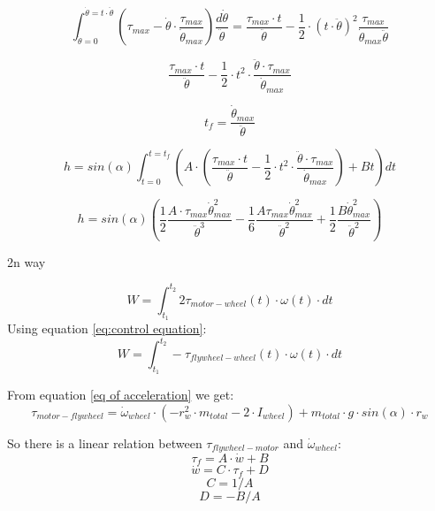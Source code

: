 \begin{enumerate}
    \[\int_{\dot{\theta}=0}^{\dot{\theta}=t\cdot\ddot{\theta}} (\tau_{max}- \dot{\theta}\cdot\frac{\tau_{max}}{\dot{\theta}_{max}}) \frac{d\dot{\theta}}{\ddot{\theta}} =
    \frac{\tau_{max} \cdot t}{\ddot{\theta}} - \frac{1}{2}\cdot(t\cdot\ddot{\theta})^2 \frac{\tau_{max}}{\dot{\theta}_{max}\ddot{\theta}} 
    \]

    \[ \frac{\tau_{max} \cdot t}{\ddot{\theta}} - \frac{1}{2}\cdot t^2\cdot \frac{\ddot{\theta} \cdot \tau_{max}}{\dot{\theta}_{max}}\]

    \[t_f = \frac{\dot{\theta}_{max}}{\ddot{\theta}}\]

    \[h=sin(\alpha)\int_{t=0}^{t=t_f} (A \cdot(\frac{\tau_{max} \cdot t}{\ddot{\theta}} - \frac{1}{2}\cdot t^2\cdot \frac{\ddot{\theta} \cdot \tau_{max}}{\dot{\theta}_{max}} ) +B t)dt \]

    \[h=sin(\alpha)(\frac{1}{2}\frac{A\cdot\tau_{max}\dot{\theta}^2_{max}}{\ddot{\theta}^3} - \frac{1}{6}\frac{A\tau_{max} \dot{\theta}^2_{max}}{\ddot{\theta}^2} + \frac{1}{2}\frac{B \dot{\theta}^2_{max}}{\ddot{\theta}^2})\]

    2n way

    \begin{equation*}
        W=\int_{t_1}^{t_2}2\tau_{motor-wheel}(t)\cdot \omega(t) \cdot dt       
    \end{equation*}
    Using equation \ref{eq:control equation}:
    \begin{equation*}
        W=\int_{t_1}^{t_2}-\tau_{flywheel-wheel}(t)\cdot \omega(t) \cdot dt       
    \end{equation*}

    From equation \ref{eq of acceleration} we get:
    \begin{equation*}
        \tau_{motor-flywheel} =
        \dot{\omega}_{wheel} \cdot (-r_w^2\cdot m_{total}
        -2\cdot I_{wheel})
        + m_{total} \cdot g \cdot sin(\alpha) \cdot r_w
    \end{equation*}

    So there is a linear relation between $\tau_{flywheel-motor}$ and 
    $\dot{\omega}_{wheel}$:
    \begin{equation}
        \tau_f=A\cdot \dot{w}+ B
        \label{eq: tau-domega linear dependency}
    \end{equation}
    \begin{equation*}
        \dot{w}=C \cdot \tau_f+ D
    \end{equation*}
    \begin{equation*}
        C = 1/A
    \end{equation*}
    \begin{equation*}
        D = -B/A
    \end{equation*}


\end{enumerate}
